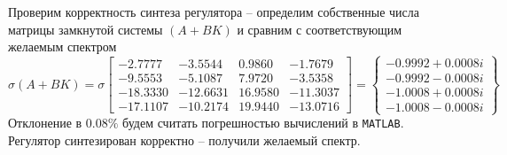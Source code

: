 \documentclass[a4paper, 12pt]{article}
\begin{document}
    Проверим корректность синтеза регулятора -- определим собственные числа
    матрицы замкнутой системы $\left(A+BK\right)$ и сравним с соответствующим
    желаемым спектром
    $$
    \sigma\left(A+BK\right)=\sigma\begin{bmatrix}
    -2.7777   &-3.5544    &0.9860   &-1.7679\\
   -9.5553   &-5.1087    &7.9720   &-3.5358\\
  -18.3330  &-12.6631   &16.9580  &-11.3037\\
  -17.1107  &-10.2174   &19.9440  &-13.0716
    \end{bmatrix}=\left\{\begin{matrix}
    -0.9992 + 0.0008i\\
  -0.9992 - 0.0008i\\
  -1.0008 + 0.0008i\\
  -1.0008 - 0.0008i
    \end{matrix}\right\}
    $$
    Отклонение в $0.08\%$ будем считать погрешностью вычислений в \texttt{MATLAB}.
    Регулятор синтезирован корректно -- получили желаемый спектр.
\end{document}
